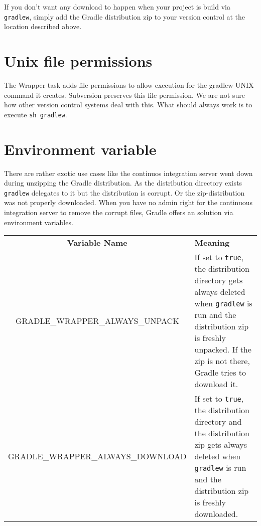 If you don't want any download to happen when your project is build via \texttt{gradlew}, simply add the Gradle distribution zip to your version control at the location described above. 

\section{Unix file permissions} %
\label{sec:unix_file_permissions}
The Wrapper task adds file permissions to allow execution for the gradlew UNIX command it creates. Subversion preserves this file permission. We are not sure how other version control systems deal with this. What should always work is to execute \texttt{sh gradlew}. 


\section{Environment variable} %
\label{sec:environment_variable}
There are rather exotic use cases like the continuos integration server went down during unzipping the Gradle distribution. As the distribution directory exists \texttt{gradlew} delegates to it but the distribution is corrupt. Or the zip-distribution was not properly downloaded. When you have no admin right for the continuous integration server to remove the corrupt files, Gradle offers an solution via environment variables.

\begin{tabularx}{\textwidth}{cX} 
	\textbf{Variable Name} & \centerline{\textbf{Meaning}}\\
    GRADLE\_WRAPPER\_ALWAYS\_UNPACK & If set to \texttt{true}, the distribution directory gets always deleted when \texttt{gradlew} is run and the distribution zip is freshly unpacked. If the zip is not there, Gradle tries to download it. \\
	GRADLE\_WRAPPER\_ALWAYS\_DOWNLOAD & If set to \texttt{true}, the distribution directory and the distribution zip gets always deleted when \texttt{gradlew} is run and the distribution zip is freshly downloaded. \\
\end{tabularx}
